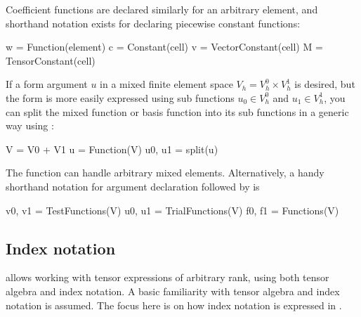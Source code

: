 Coefficient functions are declared similarly for an arbitrary element,
and shorthand notation exists for declaring piecewise constant
functions:
\begin{code}
w = Function(element)
c = Constant(cell)
v = VectorConstant(cell)
M = TensorConstant(cell)
\end{code}
If a form argument $u$ in a mixed finite element space $V_h = V_h^0
\times V_h^1$ is desired, but the form is more easily expressed using
sub functions $u_0 \in V_h^0$ and $u_1 \in V_h^1$, you can split the
mixed function or basis function into its sub functions in a generic
way using :
\begin{code}
V = V0 + V1
u = Function(V)
u0, u1 = split(u)
\end{code}
The  function can handle arbitrary mixed elements.
Alternatively, a handy shorthand notation for argument declaration
followed by  is
\begin{code}
v0, v1 = TestFunctions(V)
u0, u1 = TrialFunctions(V)
f0, f1 = Functions(V)
\end{code}


\subsection{Index notation}
\label{ufl:sec:indexnotation}

\ufl{} allows working with tensor expressions of arbitrary rank,
using both tensor algebra and index notation.  A basic familiarity
with tensor algebra and index notation is assumed.  The focus here is
on how index notation is expressed in \ufl{}.

